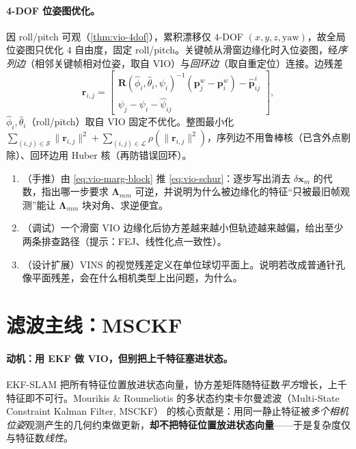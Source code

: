 \paragraph{4-DOF 位姿图优化。}
因 roll/pitch 可观（\cref{thm:vio-4dof}），累积漂移仅 $4$-DOF $(x,y,z,\text{yaw})$，故全局位姿图只优化 $4$ 自由度，固定 roll/pitch。关键帧从滑窗边缘化时入位姿图，经\emph{序列边}（相邻关键帧相对位姿，取自 VIO）与\emph{回环边}（取自重定位）连接。边残差
\begin{equation}
  \mathbf{r}_{i,j}=\begin{bmatrix}\mathbf{R}(\hat\phi_i,\hat\theta_i,\psi_i)^{-1}(\mathbf{p}^w_j-\mathbf{p}^w_i)-\hat{\mathbf{p}}^i_{ij}\\ \psi_j-\psi_i-\hat\psi_{ij}\end{bmatrix},
  \label{eq:vio-posegraph}
\end{equation}
$\hat\phi_i,\hat\theta_i$（roll/pitch）取自 VIO 固定不优化。整图最小化 $\sum_{(i,j)\in\mathcal{S}}\|\mathbf{r}_{i,j}\|^2+\sum_{(i,j)\in\mathcal{L}}\rho(\|\mathbf{r}_{i,j}\|^2)$，序列边不用鲁棒核（已含外点剔除）、回环边用 Huber 核（再防错误回环）。

\begin{practice}
\begin{enumerate}
  \item （手推）由 \cref{eq:vio-marg-block} 推 \cref{eq:vio-schur}：逐步写出消去 $\delta\mathbf{x}_m$ 的代数，指出哪一步要求 $\boldsymbol{\Lambda}_{mm}$ 可逆，并说明为什么被边缘化的特征“只被最旧帧观测”能让 $\boldsymbol{\Lambda}_{mm}$ 块对角、求逆便宜。
  \item （调试）一个滑窗 VIO 边缘化后协方差越来越小但轨迹越来越偏，给出至少两条排查路径（提示：FEJ、线性化点一致性）。
  \item （设计扩展）VINS 的视觉残差定义在单位球切平面上。说明若改成普通针孔像平面残差，会在什么相机类型上出问题，为什么。
\end{enumerate}
\end{practice}

\section{滤波主线：MSCKF}
\label{sec:vio-msckf}

\paragraph{动机：用 EKF 做 VIO，但别把上千特征塞进状态。}
EKF-SLAM 把所有特征位置放进状态向量，协方差矩阵随特征数\emph{平方}增长，上千特征即不可行。Mourikis \& Roumeliotis 的多状态约束卡尔曼滤波（Multi-State Constraint Kalman Filter, MSCKF）\cite{mourikis2007msckf} 的核心贡献是：用同一静止特征被\emph{多个相机位姿}观测产生的几何约束做更新，\textbf{却不把特征位置放进状态向量}——于是复杂度仅与特征数\emph{线性}。

